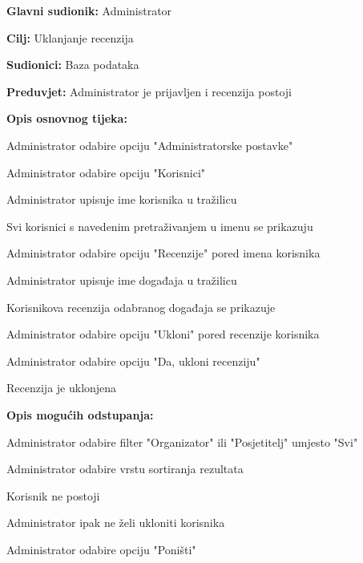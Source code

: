 					\noindent {}
					\begin{packed_item}
	
						\item \textbf{Glavni sudionik:} Administrator
						\item  \textbf{Cilj:} Uklanjanje recenzija
						\item  \textbf{Sudionici:} Baza podataka
						\item  \textbf{Preduvjet:} Administrator je prijavljen i recenzija postoji
						\item  \textbf{Opis osnovnog tijeka:}
						
						\item[] \begin{packed_enum}
	
							\item Administrator odabire opciju "Administratorske postavke"
							\item Administrator odabire opciju "Korisnici"
							\item Administrator upisuje ime korisnika u tražilicu
							\item Svi korisnici s navedenim pretraživanjem u imenu se prikazuju
							\item Administrator odabire opciju "Recenzije" pored imena korisnika
							\item Administrator upisuje ime događaja u tražilicu
							\item Korisnikova recenzija odabranog događaja se prikazuje
							\item Administrator odabire opciju "Ukloni" pored recenzije korisnika
							\item Administrator odabire opciju "Da, ukloni recenziju"
							\item Recenzija je uklonjena
						\end{packed_enum}
						
						\item  \textbf{Opis mogućih odstupanja:}
						
						\item[] \begin{packed_item}
	
							\item[3.a] Administrator odabire filter "Organizator" ili "Posjetitelj" umjesto "Svi"
							\item[3.b] Administrator odabire vrstu sortiranja rezultata
							\item[4.a] Korisnik ne postoji
							\item[9.a] Administrator ipak ne želi ukloniti korisnika
							\item[] \begin{packed_enum}
								
								\item Administrator odabire opciju "Poništi"
								
							\end{packed_enum}
						\end{packed_item}
					\end{packed_item}

